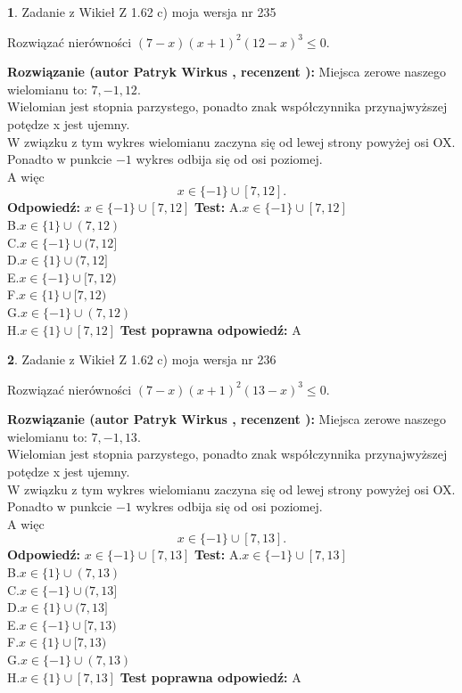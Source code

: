 \documentclass[12pt, a4paper]{article}
\theoremstyle{definition} %
\newtheorem{zad}{}
\newcommand{\zadStart}[1]{\begin{zad}#1\newline}
\newcommand{\zadStop}{\end{zad}}
\newcommand{\rozwStart}[2]{\noindent \textbf{Rozwiązanie (autor #1 , recenzent #2): }\newline}
\newcommand{\rozwStop}{\newline}
\newcommand{\odpStart}{\noindent \textbf{Odpowiedź:}\newline}
\newcommand{\odpStop}{\newline}
\newcommand{\testStart}{\noindent \textbf{Test:}\newline}
\newcommand{\testStop}{\newline}
\newcommand{\kluczStart}{\noindent \textbf{Test poprawna odpowiedź:}\newline}
\newcommand{\kluczStop}{\newline}
\begin{document}
\zadStart{Zadanie z Wikieł Z 1.62 c) moja wersja nr 235}

Rozwiązać nierówności $(7-x)(x+1)^{2}(12-x)^{3}\le0$.
\zadStop
\rozwStart{Patryk Wirkus}{}
Miejsca zerowe naszego wielomianu to: $7, -1, 12$.\\
Wielomian jest stopnia parzystego, ponadto znak współczynnika przy\linebreak najwyższej potędze x jest ujemny.\\ W związku z tym wykres wielomianu zaczyna się od lewej strony powyżej osi OX.\\
Ponadto w punkcie $-1$ wykres odbija się od osi poziomej.\\
A więc $$x \in \{-1\} \cup [7,12].$$
\rozwStop
\odpStart
$x \in \{-1\} \cup [7,12]$
\odpStop
\testStart
A.$x \in \{-1\} \cup [7,12]$\\
B.$x \in \{1\} \cup (7,12)$\\
C.$x \in \{-1\} \cup (7,12]$\\
D.$x \in \{1\} \cup (7,12]$\\
E.$x \in \{-1\} \cup [7,12)$\\
F.$x \in \{1\} \cup [7,12)$\\
G.$x \in \{-1\} \cup (7,12)$\\
H.$x \in \{1\} \cup [7,12]$
\testStop
\kluczStart
A
\kluczStop



\zadStart{Zadanie z Wikieł Z 1.62 c) moja wersja nr 236}

Rozwiązać nierówności $(7-x)(x+1)^{2}(13-x)^{3}\le0$.
\zadStop
\rozwStart{Patryk Wirkus}{}
Miejsca zerowe naszego wielomianu to: $7, -1, 13$.\\
Wielomian jest stopnia parzystego, ponadto znak współczynnika przy\linebreak najwyższej potędze x jest ujemny.\\ W związku z tym wykres wielomianu zaczyna się od lewej strony powyżej osi OX.\\
Ponadto w punkcie $-1$ wykres odbija się od osi poziomej.\\
A więc $$x \in \{-1\} \cup [7,13].$$
\rozwStop
\odpStart
$x \in \{-1\} \cup [7,13]$
\odpStop
\testStart
A.$x \in \{-1\} \cup [7,13]$\\
B.$x \in \{1\} \cup (7,13)$\\
C.$x \in \{-1\} \cup (7,13]$\\
D.$x \in \{1\} \cup (7,13]$\\
E.$x \in \{-1\} \cup [7,13)$\\
F.$x \in \{1\} \cup [7,13)$\\
G.$x \in \{-1\} \cup (7,13)$\\
H.$x \in \{1\} \cup [7,13]$
\testStop
\kluczStart
A
\kluczStop
\end{document}

